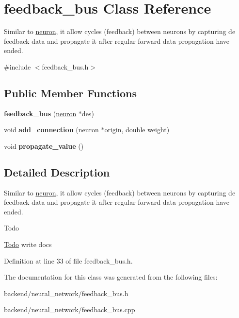 \hypertarget{classfeedback__bus}{}\section{feedback\+\_\+bus Class Reference}
\label{classfeedback__bus}


Similar to \mbox{\hyperlink{classneuron}{neuron}}, it allow cycles (feedback) between neurons by capturing de feedback data and propagate it after regular forward data propagation have ended.  




{\ttfamily \#include $<$feedback\+\_\+bus.\+h$>$}

\subsection*{Public Member Functions}
\begin{DoxyCompactItemize}
\item 
\mbox{\label{classfeedback__bus_a0eab17d3da687177bae330941752e4d5}} 
{\bfseries feedback\+\_\+bus} (\mbox{\hyperlink{classneuron}{neuron}} $\ast$des)
\item 
\mbox{\label{classfeedback__bus_a6d092b9d2e3868f0780dd75ddf0c35ac}} 
void {\bfseries add\+\_\+connection} (\mbox{\hyperlink{classneuron}{neuron}} $\ast$origin, double weight)
\item 
\mbox{\label{classfeedback__bus_aa26c71125fe3bc234aad9c7d21a069ce}} 
void {\bfseries propagate\+\_\+value} ()
\end{DoxyCompactItemize}


\subsection{Detailed Description}
Similar to \mbox{\hyperlink{classneuron}{neuron}}, it allow cycles (feedback) between neurons by capturing de feedback data and propagate it after regular forward data propagation have ended. 

\begin{DoxyRefDesc}{Todo}
\item[\mbox{\hyperlink{todo__todo000001}{Todo}}]write docs \end{DoxyRefDesc}


Definition at line 33 of file feedback\+\_\+bus.\+h.



The documentation for this class was generated from the following files\+:\begin{DoxyCompactItemize}
\item 
backend/neural\+\_\+network/feedback\+\_\+bus.\+h\item 
backend/neural\+\_\+network/feedback\+\_\+bus.\+cpp\end{DoxyCompactItemize}
